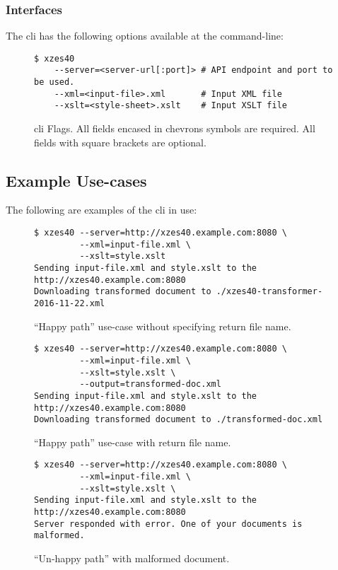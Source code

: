 \subsubsection{Interfaces}

The \gls{cli} has the following options available at the command-line:
\begin{figure}
    \begin{lstlisting}
$ xzes40
    --server=<server-url[:port]> # API endpoint and port to be used.
    --xml=<input-file>.xml       # Input XML file
    --xslt=<style-sheet>.xslt    # Input XSLT file
    \end{lstlisting}
    \caption{\gls{cli} Flags. All fields encased in chevrons symbols are required. All fields with square brackets are optional.}
\end{figure}

\subsection{Example Use-cases}

The following are examples of the \gls{cli} in use:

\begin{figure}
    \begin{lstlisting}
$ xzes40 --server=http://xzes40.example.com:8080 \
         --xml=input-file.xml \
         --xslt=style.xslt
Sending input-file.xml and style.xslt to the http://xzes40.example.com:8080
Downloading transformed document to ./xzes40-transformer-2016-11-22.xml
    \end{lstlisting}
    \caption{``Happy path'' use-case without specifying return file name.}
\end{figure}


\begin{figure}
    \begin{lstlisting}
$ xzes40 --server=http://xzes40.example.com:8080 \
         --xml=input-file.xml \
         --xslt=style.xslt \
         --output=transformed-doc.xml
Sending input-file.xml and style.xslt to the http://xzes40.example.com:8080
Downloading transformed document to ./transformed-doc.xml
    \end{lstlisting}
   \caption{``Happy path'' use-case with return file name.}
\end{figure}

\begin{figure}
    \begin{lstlisting}
$ xzes40 --server=http://xzes40.example.com:8080 \
         --xml=input-file.xml \
         --xslt=style.xslt \
Sending input-file.xml and style.xslt to the http://xzes40.example.com:8080
Server responded with error. One of your documents is malformed.
    \end{lstlisting}
    \caption{``Un-happy path'' with malformed document.}
\end{figure}


